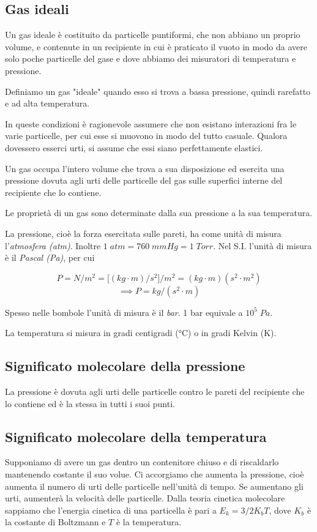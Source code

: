 \subsection{Gas ideali}
Un gas ideale è costituito da particelle puntiformi, che non abbiano un proprio volume, e contenute in un recipiente in cui è praticato il vuoto in modo da avere solo poche particelle del gase e dove abbiamo dei misuratori di temperatura e pressione.

Definiamo un gas "ideale" quando esso si trova a bassa pressione, quindi rarefatto e ad alta temperatura.

In queste condizioni è ragionevole assumere che non esistano interazioni fra le varie particelle, per cui esse si muovono in modo del tutto casuale. Qualora dovessero esserci urti, si assume che essi siano perfettamente elastici.

Un gas occupa l'intero volume che trova a sua disposizione ed esercita una pressione dovuta agli urti delle particelle del gas sulle superfici interne del recipiente che lo contiene.

Le proprietà di un gas sono determinate dalla sua pressione a la sua temperatura.

\vspace{0.2cm}La pressione, cioè la forza esercitata sulle pareti, ha come unità di misura l'\textit{atmosfera (atm)}. Inoltre $1 \; atm=760 \; mmHg=1 \; Torr$. Nel S.I. l'unità di misura è il \textit{Pascal (Pa)}, per cui

$$P=N/m^2=\big[ (kg \cdot m)/s^2 \big]/m^2=(kg \cdot m)(s^2 \cdot m^2)$$
$$\implies P=kg/(s^2 \cdot m)$$

Spesso nelle bombole l'unità di misura è il \textit{bar}. 1 bar equivale a $10^5 \; Pa$.

La temperatura si misura in gradi centigradi (°C) o in gradi Kelvin (K).
\subsection{Significato molecolare della pressione}
La pressione è dovuta agli urti delle particelle contro le pareti del recipiente che lo contiene ed è la stessa in tutti i suoi punti.
\subsection{Significato molecolare della temperatura}
Supponiamo di avere un gas dentro un contenitore chiuso e di riscaldarlo mantenendo costante il suo volue. Ci accorgiamo che aumenta la pressione, cioè aumenta il numero di urti delle particelle nell'unità di tempo. Se aumentano gli urti, aumenterà la velocità delle particelle. Dalla teoria cinetica molecolare sappiamo che l'energia cinetica di una particella è pari a $E_k=3/2 K_bT$, dove $K_b$ è la costante di Boltzmann e $T$ è la temperatura.

